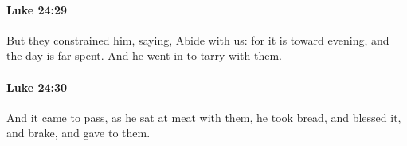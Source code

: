 		\paragraph{Luke 24:29} %
			\label{LUKE-24-29}

			But they constrained him, saying, Abide with us: for it is toward evening, and the day is far spent. And he went in to tarry with them.

			\begin{framed}
			\scriptsize
				\begin{compactdesc}
					\item[SBLG] 
				\end{compactdesc}
			\end{framed}

		\paragraph{Luke 24:30} %
			\label{LUKE-24-30}

			And it came to pass, as he sat at meat with them, he took bread, and blessed it, and brake, and gave to them.

